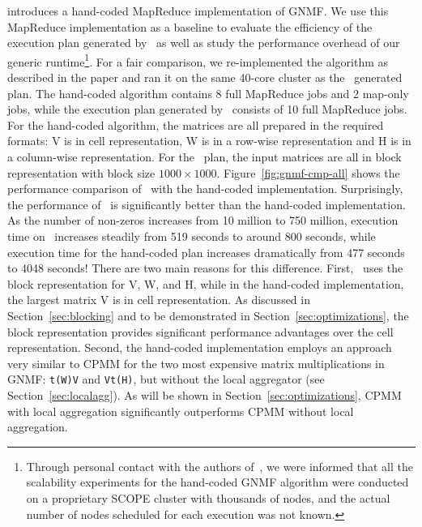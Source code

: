  \cite{msrwww10} introduces a hand-coded MapReduce implementation of GNMF. We use this MapReduce
implementation as a baseline to evaluate the efficiency of the execution plan generated
by \systemmlit\ as well as study the performance overhead of our generic runtime\footnote {Through
personal contact with the authors of~\cite{msrwww10}, we were informed that all the scalability
experiments for the hand-coded GNMF algorithm were conducted on a proprietary SCOPE cluster with
thousands of nodes, and the actual number of nodes scheduled for each execution was not known.}. For a
fair comparison, we re-implemented the algorithm as described in the paper and ran it on the same
40-core cluster as the \systemmltext\ generated plan. The hand-coded algorithm contains 8 full
MapReduce jobs and 2 map-only jobs, while the execution plan generated by \systemmltext\ consists of
10 full MapReduce jobs. For the hand-coded algorithm, the matrices are all prepared in the required
formats: V is in cell representation, W is in a row-wise representation and H is in a column-wise
representation. For the \systemmltext\ plan, the input matrices are all in block representation with block
size $1000\times 1000$. Figure~\ref{fig:gnmf-cmp-all} shows the performance comparison
of \systemmltext\ with the hand-coded implementation. Surprisingly, the performance
of \systemmltext\ is significantly better than the hand-coded implementation. As the number of
non-zeros increases from 10 million to 750 million, execution time on \systemmlit\ increases steadily from 519 seconds
to around 800 seconds, while execution time for the hand-coded plan increases dramatically from 477 seconds to 4048
seconds! There are two main reasons for this difference. First, \systemmltext\ uses the block
representation for V, W, and H, while in the hand-coded implementation, the largest matrix V is in
cell representation. As discussed in Section~\ref{sec:blocking} and to be demonstrated in
Section~\ref{sec:optimizations}, the block representation provides significant performance advantages over
the cell representation. Second, the hand-coded implementation employs an approach very similar to
CPMM for the two most expensive matrix multiplications in GNMF: \texttt{t(W)\mmult V}
and \texttt{V\mmult t(H)}, but without the local aggregator (see Section~\ref{sec:localagg}). As will
be shown in Section~\ref{sec:optimizations}, CPMM with local aggregation significantly outperforms
CPMM without local aggregation.

